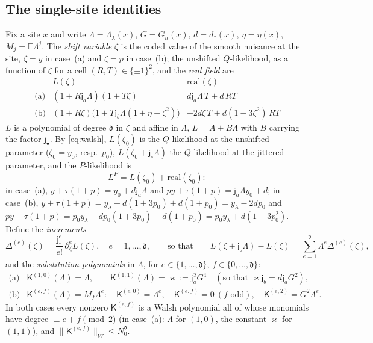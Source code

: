 \documentclass[11pt]{article}
\newcommand{\E}{\mathbb{E}}
\newcommand{\norm}[1]{\lVert #1\rVert}
\newcommand{\ja}{\mathsf{j}_a}
\newcommand{\jb}{\mathsf{j}_b}
\newcommand{\jsh}{\mathsf{j}_\circ}
\newcommand{\jfi}{\mathsf{j}_\bullet}
\newcommand{\dg}{\mathfrak{d}}
\newcommand{\K}{\mathsf{K}}
\newcommand{\real}{\mathrm{real}}
\begin{document}
\subsection{The single-site identities}\label{C:sec:bridge}
Fix a site \(x\) and write \(\Lambda=\Lambda_\lambda(x)\), \(G=G_h(x)\),
\(d=d_*(x)\), \(\eta=\eta(x)\), \(M_j=\E\Lambda^j\).  The \emph{shift
variable} \(\zeta\) is the coded value of the smooth nuisance at the
site, \(\zeta=y\) in case~(a) and \(\zeta=p\) in case~(b); the unshifted
\(Q\)-likelihood, as a function of \(\zeta\) for a cell
\((R,T)\in\{\pm1\}^2\), and the \emph{real field} are
\begin{equation}
\begin{array}{c|cc}
 &L(\zeta)&\real(\zeta)\\ \hline
 \text{(a)}&(1+R\ja\Lambda)(1+T\zeta)&d\ja\Lambda\,T+d\,RT\\[2pt]
 \text{(b)}&(1+R\zeta)\bigl(1+T\jb\Lambda(1+\eta-\zeta^2)\bigr)&-2d\zeta\,T+d(1-3\zeta^2)\,RT
\end{array}
\label{C:eq:L-real}
\end{equation}
\(L\) is a polynomial of degree \(\dg\) in \(\zeta\) and affine in
\(\Lambda\), \(L=A+B\Lambda\) with \(B\) carrying the factor \(\jfi\).  By
\eqref{eq:walsh}, \(L(\zeta_0)\) is the \(Q\)-likelihood at the unshifted
parameter (\(\zeta_0=y_0\), resp.\ \(p_0\)), \(L(\zeta_0+\jsh\Lambda)\) the
\(Q\)-likelihood at the jittered parameter, and the \(P\)-likelihood is
\begin{equation}
 L^P=L(\zeta_0)+\real(\zeta_0):
 \label{C:eq:LP}
\end{equation}
in case~(a), \(y+\tau(1+p)=y_0+d\ja\Lambda\) and \(py+\tau(1+p)=\ja\Lambda y_0+d\);
in case~(b), \(y+\tau(1+p)=y_\lambda-d(1+3p_0)+d(1+p_0)=y_\lambda-2dp_0\) and
\(py+\tau(1+p)=p_0y_\lambda-dp_0(1+3p_0)+d(1+p_0)=p_0y_\lambda+d(1-3p_0^2)\).
Define the \emph{increments}
\begin{equation}
 \Delta^{(e)}(\zeta)=\frac{\jsh^e}{e!}\,\partial_\zeta^eL(\zeta),\quad e=1,\dots,\dg,
 \qquad\text{so that}\qquad
 L(\zeta+\jsh\Lambda)-L(\zeta)=\sum_{e=1}^{\dg}\Lambda^e\Delta^{(e)}(\zeta),
 \label{C:eq:increments}
\end{equation}
and the \emph{substitution polynomials} in \(\Lambda\), for
\(e\in\{1,\dots,\dg\}\), \(f\in\{0,\dots,\dg\}\):
\begin{equation}
\begin{array}{c|l}
 \text{(a)}&\K^{(1,0)}(\Lambda)=\Lambda,\qquad \K^{(1,1)}(\Lambda)=\varkappa:=\ja^2G^4
 \quad(\text{so that }\varkappa\jb=d\ja G^2),\\[2pt]
 \text{(b)}&\K^{(e,f)}(\Lambda)=M_f\Lambda^e:\quad
 \K^{(e,0)}=\Lambda^e,\quad \K^{(e,f)}=0\ (f\text{ odd}),\quad \K^{(e,2)}=G^2\Lambda^e .
\end{array}
\label{C:eq:K}
\end{equation}
In both cases every nonzero \(\K^{(e,f)}\) is a Walsh polynomial all of
whose monomials have degree \(\equiv e+f\pmod2\) (in case~(a):
\(\Lambda\) for \((1,0)\), the constant \(\varkappa\) for \((1,1)\)), and
\(\norm{\K^{(e,f)}}_W\le N_0^{\dg}\).
\end{document}
